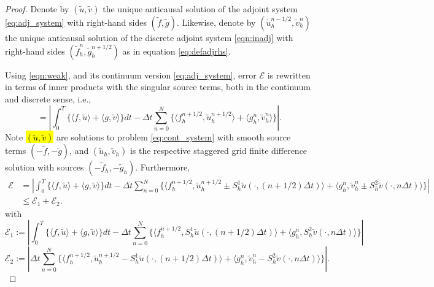 \begin{proof}
Denote by $(\tilde u, \tilde v)$ the unique anticausal solution of the adjoint system \ref{eq:adj_system}
with right-hand sides $(\tilde f,\tilde g)$. Likewise, denote by $(\tilde{u}^{n-1/2}_h,\tilde{v}^n_h)$ the unique
anticausal solution of the discrete adjoint system \ref{eqn:inadj}
with right-hand sides $(\tilde{f}^{n}_h,\tilde{g}^{n+1/2}_h) $ as in
equation \ref{eq:defadjrhs}.

Using \ref{eqn:weak}, and its continuum version \ref{eq:adj_system}, error $\mathcal E$ is rewritten in terms of inner products with the singular source terms, both in the continuum and discrete sense, i.e.,
\[
	\mathcal = \left| \int_0^T  \Big\{ \langle f,\tilde u \rangle + \langle g,\tilde v\rangle \Big\} dt -
		\Delta t \sum_{n=0}^N \Big\{ \langle f_h^{n+1/2}, \tilde u_h^{n+1/2} \rangle +
						 	   \langle g_h^{n}, \tilde v_h^{n}  \rangle \Big\} \right|.
\]
Note \hl{$(\tilde u,\tilde v)$} are solutions to problem \ref{eq:cont_system} with smooth source terms 
$(-\tilde f,-\tilde g)$, and $(\tilde u_h,\tilde v_h)$ is the respective staggered grid finite difference solution with sources $(-\tilde f_h,-\tilde g_h)$.
Furthermore,
\begin{equation*}
\begin{split}
\mathcal E &= \left| \int_0^T  \Big\{ \langle f,\tilde u \rangle + \langle g,\tilde v\rangle \Big\} dt -
		\Delta t \sum_{n=0}^N \Big\{ \langle f_h^{n+1/2}, \tilde u_h^{n+1/2} \pm S_{h}^1\tilde u(\cdot,(n+1/2)\Delta t) \rangle +
						 	   \langle g_h^{n}, \tilde v_h^{n} \pm S_{h}^2 \tilde v(\cdot,n\Delta t) \rangle \Big\} \right|\\
	& \le \mathcal E_1 + \mathcal E_2.
\end{split}
\end{equation*}
with
\[
\mathcal E_1 := \left|  \int_0^T  \Big\{ \langle f,\tilde u \rangle + \langle g,\tilde v\rangle \Big\} dt
			-\Delta t \sum_{n=0}^{N} \Big\{  \langle f_h^{n+1/2}, S_{h}^1\tilde u(\cdot,(n+1/2)\Delta t) \rangle +
			\langle g_h^n, S_{h}^2 \tilde v(\cdot,n\Delta t) \rangle \Big\} \right|
\]
\[
\mathcal E_2 := \left| \Delta t \sum_{n=0}^N \Big\{ \langle f_h^{n+1/2}, 
				\tilde u_h^{n+1/2} - S_h^1 \tilde u(\cdot,(n+1/2)\Delta t) \rangle 
			+ \langle g_h^n, \tilde v_h^n - S_h^2 \tilde v(\cdot,n\Delta t) \rangle \Big\} \right|.
\]


\end{proof}
